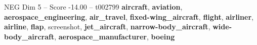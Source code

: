\begin{textsample}{NEG Dim 5 – Score -14.00 – t002799}  \label{ex:f5_neg_025}
\textbf{aircraft}, \textbf{aviation}, \textbf{aerospace\_engineering}, \textbf{air\_travel}, \textbf{fixed-wing\_aircraft}, \textbf{flight}, \textbf{airliner}, \textbf{airline}, \textbf{flap}, screenshot, \textbf{jet\_aircraft}, \textbf{narrow-body\_aircraft}, \textbf{wide-body\_aircraft}, \textbf{aerospace\_manufacturer}, \textbf{boeing}

\end{textsample}
